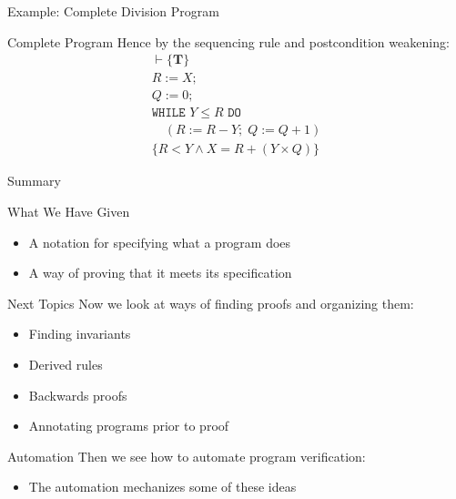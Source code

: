\begin{frame}{Example: Complete Division Program}
    \begin{block}{Complete Program}
        Hence by the sequencing rule and postcondition weakening:
        \begin{align*}
        \vdash \{\mathbf{T}\} \\
        R:=X; \\
        Q:=0; \\
        \texttt{WHILE } Y \leq R \texttt{ DO} \\
        \quad (R:=R-Y; \; Q:=Q+1) \\
        \{R < Y \wedge X=R+(Y \times Q)\}
        \end{align*}
    \end{block}
\end{frame}

\begin{frame}{Summary}
    \begin{block}{What We Have Given}
        \begin{itemize}
            \item A notation for specifying what a program does
            \item A way of proving that it meets its specification
        \end{itemize}
    \end{block}
    
    \begin{block}{Next Topics}
        Now we look at ways of finding proofs and organizing them:
        \begin{itemize}
            \item Finding invariants
            \item Derived rules
            \item Backwards proofs
            \item Annotating programs prior to proof
        \end{itemize}
    \end{block}
    
    \begin{block}{Automation}
        Then we see how to automate program verification:
        \begin{itemize}
            \item The automation mechanizes some of these ideas
        \end{itemize}
    \end{block}
\end{frame}